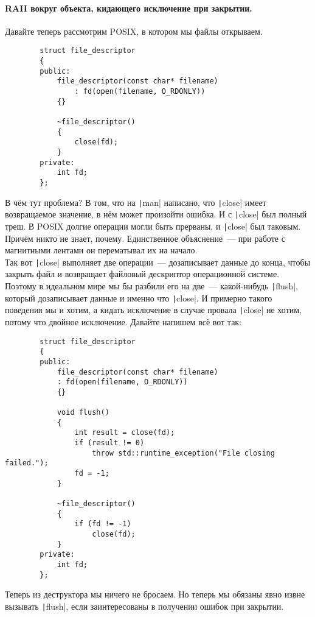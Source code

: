 \documentclass{article}
\begin{document}
    \paragraph{RAII вокруг объекта, кидающего исключение при закрытии.}
    Давайте теперь рассмотрим POSIX, в котором мы файлы открываем.
    \begin{verbatim}
        struct file_descriptor
        {
        public:          
            file_descriptor(const char* filename)
                : fd(open(filename, O_RDONLY))
            {}

            ~file_descriptor()
            {
                close(fd);
            }
        private:
            int fd;
        };
    \end{verbatim}
    В чём тут проблема? В том, что на \texttt|man| написано, что \texttt|close| имеет возвращаемое значение, в нём может произойти ошибка. И с \texttt|close| был полный треш. В POSIX долгие операции могли быть прерваны, и \texttt|close| был таковым. Причём никто не знает, почему. Единственное объяснение~--- при работе с магнитными лентами он перематывал их на начало.\\
    Так вот \texttt|close| выполняет две операции~--- дозаписывает данные до конца, чтобы закрыть файл и возвращает файловый дескриптор операционной системе. Поэтому в идеальном мире мы бы разбили его на две~--- какой-нибудь \texttt|flush|, который дозаписывает данные и именно что \texttt|close|. И примерно такого поведения мы и хотим, а кидать исключение в случае провала \texttt|close| не хотим, потому что двойное исключение. Давайте напишем всё вот так:
    \begin{verbatim}
        struct file_descriptor
        {
        public:          
            file_descriptor(const char* filename)
            : fd(open(filename, O_RDONLY))
            {}
            
            void flush()
            {
                int result = close(fd);
                if (result != 0)
                    throw std::runtime_exception("File closing failed.");
                fd = -1;
            }
            
            ~file_descriptor()
            {
                if (fd != -1)
                    close(fd);
            }
        private:
            int fd;
        };
    \end{verbatim}
    Теперь из деструктора мы ничего не бросаем. Но теперь мы обязаны явно извне вызывать \texttt|flush|, если заинтересованы в получении ошибок при закрытии.
\end{document}
